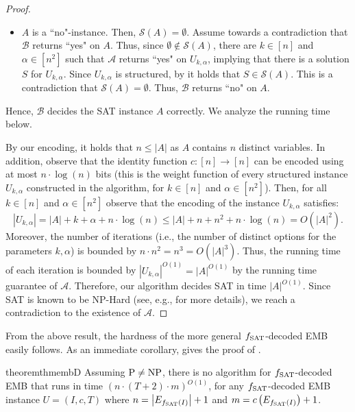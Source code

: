 \documentclass[11pt,letter]{article}
\newcommand{\cA}{{\mathcal{A}}}
\newcommand{\cB}{{\mathcal{B}}}
\newcommand{\fs}{f_{\textnormal{SAT}}}
\begin{document}
\begin{proof}
\begin{itemize}
		\item $A$ is a ``no"-instance. Then, $\mathcal{S}(A) = \emptyset$. %
		Assume towards a contradiction that $\cB$ returns ``yes" on $A$. Thus, since $\emptyset \notin \mathcal{S}(A)$, there are $k \in [n]$ and $\alpha \in \left[ n^2\right]$ such that $\cA$ returns ``yes" on $U_{k,\alpha}$, implying that there is a solution $S$ for $U_{k,\alpha}$. Since $U_{k,\alpha}$ is structured, by  it holds that $S \in \mathcal{S}(A)$. 
		This is a contradiction that $\mathcal{S}(A) = \emptyset$. Thus, $\cB$ returns ``no" on $A$. 
	\end{itemize} 
	Hence, $\cB$ decides the SAT instance $A$ correctly. We analyze the running time below.  
	
	 By our encoding, it holds that $n \leq |A|$ as $A$ contains $n$ distinct variables. In addition, observe that the identity function $c:[n] \rightarrow [n]$ can be encoded using at most $n \cdot \log (n)$ bits (this is the weight function of every structured instance $U_{k,\alpha}$ constructed in the algorithm, for $k \in [n]$ and $\alpha \in \left[n^2\right]$). Then, for all $k \in [n]$ and $\alpha \in \left[ n^2\right]$ observe that the encoding of the instance $U_{k,\alpha}$ satisfies: $$|U_{k,\alpha}| = |A|+k+\alpha+n \cdot \log (n) \leq |A|+n+n^2 +n \cdot \log (n)= O\left(|A|^2\right).$$ %
	 Moreover, the number of iterations (i.e., the number of distinct options for the parameters $k,\alpha$) is bounded by $n \cdot n^2 = n^3 = O(|A|^3)$. Thus, the running time of each iteration is bounded by $|U_{k,\alpha}|^{O(1)} = |A|^{O(1)}$ by the running time guarantee of $\cA$. Therefore, our algorithm decides SAT in time $|A|^{O(1)}$. Since SAT is known to be NP-Hard (see, e.g., \cite{garey1997computers} for more details), we reach a contradiction to the existence of $\cA$. %
\end{proof}

From the above result, the hardness of the more general $\fs$-decoded EMB easily follows. As an immediate corollary,  gives the proof of . 

	\begin{restatable}{theorem}{thmembD}
	\label{thm:embD}
	Assuming $\textnormal{P} \neq \textnormal{NP}$, there is no algorithm  for $\fs$-decoded \textnormal{EMB} that runs in time $ (n \cdot(T+2) \cdot m)^{O(1)}$, for any  $\fs$-decoded \textnormal{EMB} instance $U =(I,c,T)$ where $n = \left|E_{\fs(I)}\right|+1$ and $m = c\left(E_{\fs(I)}\right) +1$. 
\end{restatable}
\end{document}
